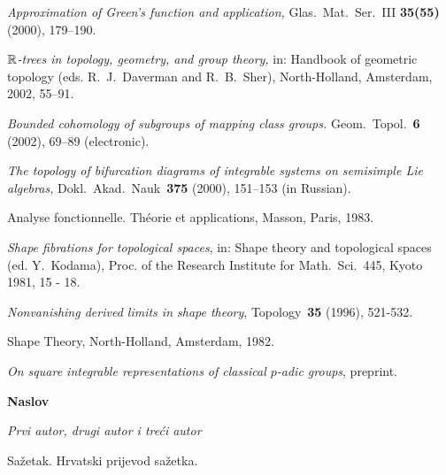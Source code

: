 \documentclass[dvips]{radhazu}
\begin{document}
\begin{thebibliography}{99}

\textit{Approximation of Green's function and application,}
Glas.~Mat.~Ser.~III \textbf{35(55)} (2000), 179--190.

\textit{$\Bbb R$-trees in topology, geometry, and group theory,}
in: Handbook of geometric topology (eds. R.~J.~Daverman and
R.~B.~Sher), North-Holland, Amsterdam, 2002, 55--91.

\textit{Bounded cohomology of subgroups of mapping class groups.}
Geom.~Topol.~\textbf{6} (2002), 69--89 (electronic).

\textit{The topology of bifurcation diagrams of integrable systems
on semisimple Lie algebras,} Dokl.~Akad.~Nauk~\textbf{375} (2000),
151--153 (in Russian).

 Analyse fonctionnelle. Th\'{e}orie
    et applications, Masson, Paris, 1983.

\textit{Shape fibrations for topological spaces}, in: Shape theory
and topological spaces (ed. Y.~Kodama), Proc. of the Research
Institute for Math.~Sci.~445, Kyoto 1981, 15 - 18.

\textit{Nonvanishing derived limits in shape theory},
Topology~\textbf{35} (1996), 521-532.

Shape Theory, North-Holland, Amsterdam, 1982.

\textit{On square integrable representations of classical $p$-adic
groups}, preprint.
\end{thebibliography}

\bigskip

\bigskip

\begin{center}
{\bf Naslov}
\end{center}

\bigskip

\begin{center}
{\it Prvi autor, drugi autor i tre\'ci autor}
\end{center}

\bigskip

\begin{center}
\begin{minipage}[c]{9.2cm}
{\small \hspace*{0.5cm} {\sc Sa\v{z}etak.}
Hrvatski prijevod sa\v{z}etka.}%
\end{minipage}
\end{center}

\endarticle 
\end{document}

